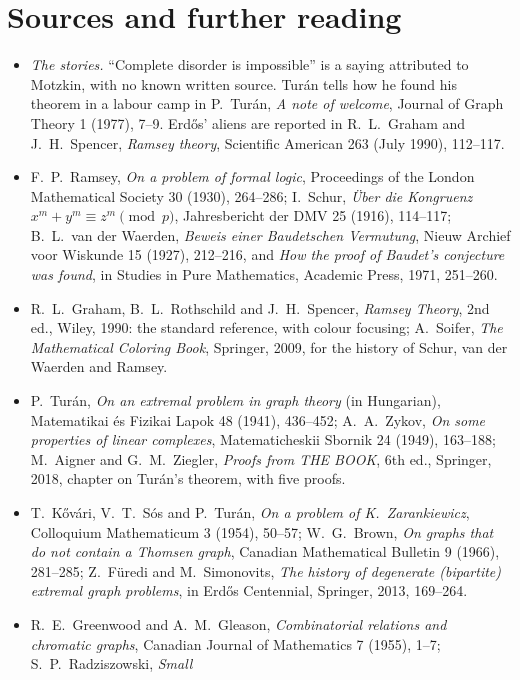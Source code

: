 \section*{Sources and further reading}

\begin{itemize}
\item \emph{The stories.} ``Complete disorder is impossible'' is a saying attributed to Motzkin, with no known written source. Tur\'an tells how he found his theorem in a labour camp in P.~Tur\'an,
\emph{A note of welcome}, Journal of Graph Theory 1 (1977), 7--9. Erd\H os' aliens are reported in R.~L.~Graham and J.~H.~Spencer, \emph{Ramsey theory}, Scientific American 263 (July 1990), 112--117.
\item F.~P.~Ramsey, \emph{On a problem of formal logic}, Proceedings of the London Mathematical Society 30 (1930), 264--286; I.~Schur, \emph{\"Uber die Kongruenz
$x^m+y^m\equiv z^m\pmod p$}, Jahresbericht der DMV 25 (1916), 114--117; B.~L.~van der Waerden, \emph{Beweis einer Baudetschen Vermutung}, Nieuw Archief voor
Wiskunde 15 (1927), 212--216, and \emph{How the proof of Baudet's conjecture was found}, in Studies in Pure Mathematics, Academic Press, 1971, 251--260.
\item R.~L.~Graham, B.~L.~Rothschild and J.~H.~Spencer, \emph{Ramsey Theory}, 2nd ed., Wiley, 1990: the standard reference, with colour focusing; A.~Soifer,
\emph{The Mathematical Coloring Book}, Springer, 2009, for the history of Schur, van der Waerden and Ramsey.
\item P.~Tur\'an, \emph{On an extremal problem in graph theory} (in Hungarian), Matematikai \'es Fizikai Lapok 48 (1941), 436--452; A.~A.~Zykov, \emph{On some properties of
linear complexes}, Matematicheskii Sbornik 24 (1949), 163--188; M.~Aigner and G.~M.~Ziegler, \emph{Proofs from THE BOOK}, 6th ed., Springer, 2018, chapter on Tur\'an's
theorem, with five proofs.
\item T.~K\H ov\'ari, V.~T.~S\'os and P.~Tur\'an, \emph{On a problem of K.~Zarankiewicz}, Colloquium Mathematicum 3 (1954), 50--57; W.~G.~Brown, \emph{On graphs that do not contain
a Thomsen graph}, Canadian Mathematical Bulletin 9 (1966), 281--285; Z.~F\"uredi and M.~Simonovits, \emph{The history of degenerate (bipartite) extremal graph problems},
in Erd\H os Centennial, Springer, 2013, 169--264.
\item R.~E.~Greenwood and A.~M.~Gleason, \emph{Combinatorial relations and chromatic graphs}, Canadian Journal of Mathematics 7 (1955), 1--7; S.~P.~Radziszowski, \emph{Small
}
\end{itemize}
